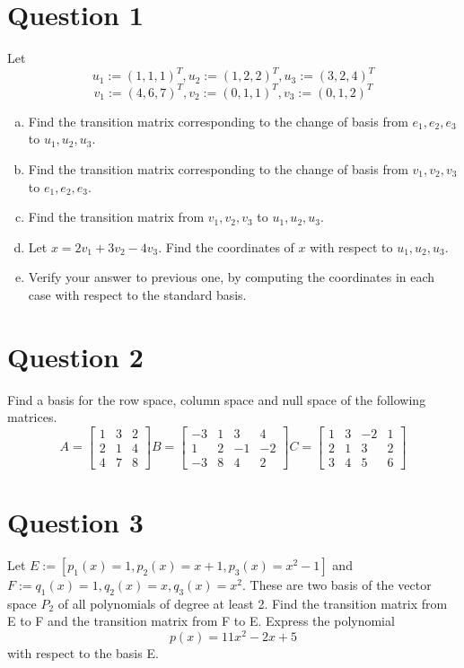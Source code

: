 \documentclass{article}
\begin{document}
\section*{Question 1}
Let
$$ u_1 := (1, 1, 1)^{T}, u_2 := (1, 2, 2)^{T}, u_3 := (3, 2, 4)^{T} $$
$$ v_1 := (4, 6, 7)^{T}, v_2 := (0, 1, 1)^{T}, v_3 := (0, 1, 2)^{T}$$
\begin{enumerate}[(a)]
    \item
    Find the transition matrix corresponding to the change of basis from ${e_1, e_2, e_3}$ to ${u_1, u_2, u_3}$.
    \item
    Find the transition matrix corresponding to the change of basis from ${v_1, v_2, v_3}$ to ${e_1, e_2, e_3}$.
    \item
    Find the transition matrix from ${v_1, v_2, v_3}$ to ${u_1, u_2, u_3}$.
    \item
    Let $x = 2v_1 + 3v_2 - 4v_3$. Find the coordinates of $x$ with respect to ${u_1, u_2, u_3}$.
    \item
    Verify your answer to previous one, by computing the coordinates in each case with respect to the standard basis.
\end{enumerate}

\section*{Question 2}
Find a basis for the row space, column space and null space of the following matrices.
$$
A = \begin{bmatrix} 1 & 3 & 2 \\ 2 & 1 & 4 \\ 4 & 7 & 8 \end{bmatrix}
B = \begin{bmatrix} -3 & 1 & 3 & 4 \\ 1 & 2 & -1 & -2 \\ -3 & 8 & 4 & 2 \end{bmatrix}
C = \begin{bmatrix} 1 & 3 & -2 & 1 \\ 2 & 1 & 3 & 2 \\ 3 & 4 & 5 & 6 \end{bmatrix}
$$

\section*{Question 3}
Let $E := [p_{1}(x) = 1, p_{2}(x) = x + 1, p_{3}(x) = x^2 - 1]$ and $F := q_{1}(x) = 1, q_{2}(x) = x, q_{3}(x) = x^2$.
These are two basis of the vector space $P_2$ of all polynomials of degree at least 2. 
Find the transition matrix from E to F and the transition matrix from F to E.
Express the polynomial $$p(x) = 11x^2 - 2x + 5$$ with respect to the basis E.
\end{document}
